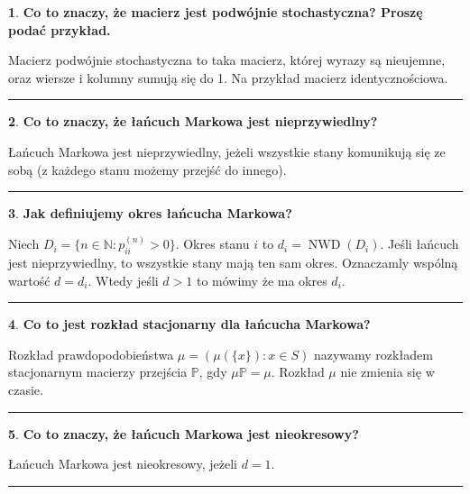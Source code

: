\documentclass[
    twocolumn,
    twoside,
    fontsize=11pt,
    paper=A0,
    DIV=30
]{scrartcl}
\theoremstyle{definition}
\newtheorem{pytanie}{}
\theoremstyle{break}
\newenvironment{odpowiedź}{\vspace{-0.7em}}{\vspace{0.3em}\hrule}
\begin{document}
\begin{pytanie}
\textbf{Co to znaczy, że macierz jest podwójnie stochastyczna? Proszę podać przykład.}
\end{pytanie}
\begin{odpowiedź}
    Macierz podwójnie stochastyczna to taka macierz,
    której wyrazy są nieujemne, oraz
    wiersze i kolumny sumują się do 1.
    Na przykład macierz identycznościowa.
\end{odpowiedź}


\begin{pytanie}
\textbf{Co to znaczy, że łańcuch Markowa jest nieprzywiedlny?}
\end{pytanie}
\begin{odpowiedź}
    Łańcuch Markowa jest nieprzywiedlny, jeżeli wszystkie
    stany komunikują się ze sobą (z każdego stanu
    możemy przejść do innego).
\end{odpowiedź}


\begin{pytanie}
\textbf{Jak definiujemy okres łańcucha Markowa?}
\end{pytanie}
\begin{odpowiedź}
    Niech $D_i = \{n \in \mathbb{N}: p_{ii}^{(n)} > 0 \}$.
    Okres stanu $i$ to $d_i=\operatorname{NWD}(D_i)$.
    Jeśli łańcuch jest nieprzywiedlny, to wszystkie stany mają ten
    sam okres. Oznaczamly wspólną wartość $d = d_i$.
    Wtedy jeśli $d > 1$ to mówimy że ma okres $d_i$.
\end{odpowiedź}


\begin{pytanie}
\textbf{Co to jest rozkład stacjonarny dla łańcucha Markowa?}
\end{pytanie}
\begin{odpowiedź}
    Rozkład prawdopodobieństwa $\mu = (\mu (\{x\}) : x\in S)$
    nazywamy rozkładem stacjonarnym macierzy przejścia $\mathbb{P}$,
    gdy $\mu \mathbb{P} = \mu$.
    Rozkład $\mu$ nie zmienia się w czasie.
\end{odpowiedź}


\begin{pytanie}
\textbf{Co to znaczy, że łańcuch Markowa jest nieokresowy?}
\end{pytanie}
\begin{odpowiedź}
    Łańcuch Markowa jest nieokresowy, jeżeli $d=1$.
\end{odpowiedź}
\end{document}
